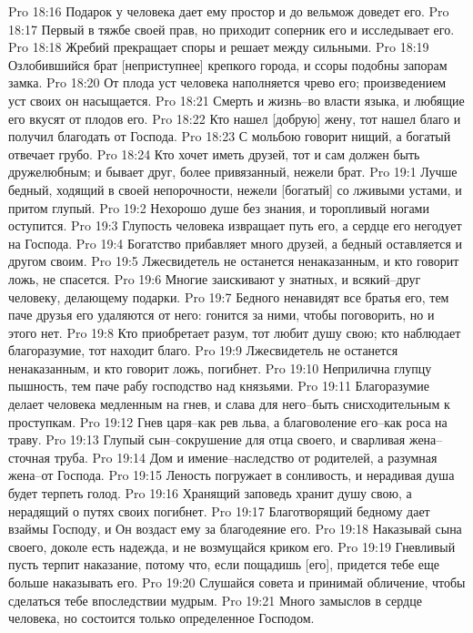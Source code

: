 Pro 18:16  Подарок у человека дает ему простор и до вельмож доведет его.
Pro 18:17  Первый в тяжбе своей прав, но приходит соперник его и исследывает его.
Pro 18:18  Жребий прекращает споры и решает между сильными.
Pro 18:19  Озлобившийся брат [неприступнее] крепкого города, и ссоры подобны запорам замка.
Pro 18:20  От плода уст человека наполняется чрево его; произведением уст своих он насыщается.
Pro 18:21  Смерть и жизнь--во власти языка, и любящие его вкусят от плодов его.
Pro 18:22  Кто нашел [добрую] жену, тот нашел благо и получил благодать от Господа.
Pro 18:23  С мольбою говорит нищий, а богатый отвечает грубо.
Pro 18:24  Кто хочет иметь друзей, тот и сам должен быть дружелюбным; и бывает друг, более привязанный, нежели брат.
Pro 19:1  Лучше бедный, ходящий в своей непорочности, нежели [богатый] со лживыми устами, и притом глупый.
Pro 19:2  Нехорошо душе без знания, и торопливый ногами оступится.
Pro 19:3  Глупость человека извращает путь его, а сердце его негодует на Господа.
Pro 19:4  Богатство прибавляет много друзей, а бедный оставляется и другом своим.
Pro 19:5  Лжесвидетель не останется ненаказанным, и кто говорит ложь, не спасется.
Pro 19:6  Многие заискивают у знатных, и всякий--друг человеку, делающему подарки.
Pro 19:7  Бедного ненавидят все братья его, тем паче друзья его удаляются от него: гонится за ними, чтобы поговорить, но и этого нет.
Pro 19:8  Кто приобретает разум, тот любит душу свою; кто наблюдает благоразумие, тот находит благо.
Pro 19:9  Лжесвидетель не останется ненаказанным, и кто говорит ложь, погибнет.
Pro 19:10  Неприлична глупцу пышность, тем паче рабу господство над князьями.
Pro 19:11  Благоразумие делает человека медленным на гнев, и слава для него--быть снисходительным к проступкам.
Pro 19:12  Гнев царя--как рев льва, а благоволение его--как роса на траву.
Pro 19:13  Глупый сын--сокрушение для отца своего, и сварливая жена--сточная труба.
Pro 19:14  Дом и имение--наследство от родителей, а разумная жена--от Господа.
Pro 19:15  Леность погружает в сонливость, и нерадивая душа будет терпеть голод.
Pro 19:16  Хранящий заповедь хранит душу свою, а нерадящий о путях своих погибнет.
Pro 19:17  Благотворящий бедному дает взаймы Господу, и Он воздаст ему за благодеяние его.
Pro 19:18  Наказывай сына своего, доколе есть надежда, и не возмущайся криком его.
Pro 19:19  Гневливый пусть терпит наказание, потому что, если пощадишь [его], придется тебе еще больше наказывать его.
Pro 19:20  Слушайся совета и принимай обличение, чтобы сделаться тебе впоследствии мудрым.
Pro 19:21  Много замыслов в сердце человека, но состоится только определенное Господом.
